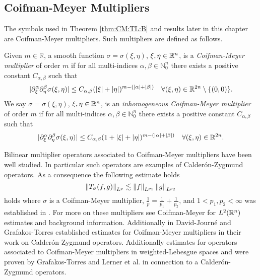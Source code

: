 \subsection{Coifman-Meyer Multipliers}\label{Coifman-Meyer Multipliers}

The symbols used in Theorem \ref{thm:CM:TL:B} and results later in this chapter are Coifman-Meyer multipliers. Such multipliers are defined as follows.

\begin{dfn}\label{CM_def}
Given $m\in\mathbb{R}$, a smooth function $\sigma = \sigma(\xi,\eta)$, $\xi,\eta\in{{\mathbb R}^n}$, is a \textit{Coifman-Meyer multiplier} of order $m$ if for all multi-indices $\alpha,\beta\in\mathbb{N}^n_0$ there exists a positive constant $C_{\alpha,\beta}$ such that 
\begin{equation}\label{eq:CMm}
|\partial_\xi^\alpha \partial_\eta^\beta \sigma(\xi, \eta)| \leq C_{\alpha, \beta} (|\xi|+|\eta|)^{m -(\left\vert \alpha \right\vert+ \left\vert \beta \right\vert)} \quad \forall (\xi, \eta) \in \mathbb{R}^{2n} \setminus \{(0,0)\}.
\end{equation}
We say $\sigma = \sigma(\xi,\eta)$, $\xi,\eta\in{{\mathbb R}^n}$, is an \textit{inhomogeneous Coifman-Meyer multiplier} of order $m$ if for all multi-indices $\alpha,\beta\in\mathbb{N}^n_0$ there exists a positive constant $C_{\alpha,\beta}$ such that 
\begin{equation}\label{eq:CMm}
|\partial_\xi^\alpha \partial_\eta^\beta \sigma(\xi, \eta)| \leq C_{\alpha, \beta} (1+|\xi|+|\eta|)^{m -(\left\vert \alpha \right\vert+ \left\vert \beta \right\vert)} \quad \forall (\xi, \eta) \in \mathbb{R}^{2n}.
\end{equation}
\end{dfn}
Bilinear multiplier operators associated to Coifman-Meyer multipliers have been well studied. In particular such operators are examples of Calder\'on-Zygmund operators. As a consequence the following estimate holds 
\[ \left\|T_\sigma(f,g)\right\|_{L^p}\lesssim \left\|f\right\|_{L^{p_1}}\left\|g\right\|_{L^{p_2}} \]
holds where $\sigma$ is a Coifman-Meyer multiplier, $\frac{1}{p} = \frac{1}{p_1} + \frac{1}{p_2}$, and $1<p_1,p_2<\infty$ was established in \citep{MR1880324}. For more on these multipliers see Coifman-Meyer \citep{MR518170} for $L^2({{\mathbb R}^n})$ estimates and background information. Additionally in David-Journ\'{e} \cite{MR763911} and Grafakos-Torres \citep{MR1880324} established estimates for Coifman-Meyer multipliers in their work on Calder\'on-Zygmund operators. Additionally estimates for operators associated to Coifman-Meyer multipliers in weighted-Lebesgue spaces and were proven by Grafakos-Torres \citep{MR1947875} and Lerner et al. \citep{MR2483720} in connection to a Calder\'{o}n-Zygmund operators. 	

